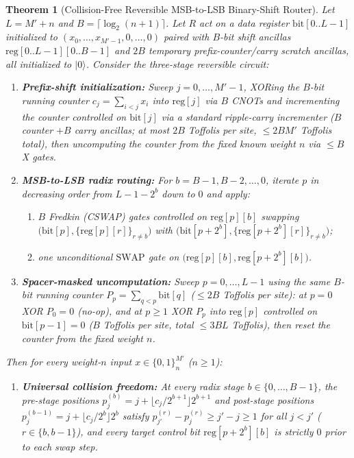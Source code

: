 \documentclass[11pt,a4paper]{article}
\newtheorem{theorem}{Theorem}
\theoremstyle{remark}
\newcommand{\ket}[1]{\lvert #1 \rangle}
\begin{document}
\begin{theorem}[Collision-Free Reversible MSB-to-LSB Binary-Shift Router]
\label{thm:C}
Let $L = M' + n$ and $B = \lceil \log_2(n + 1) \rceil$. Let $R$ act on a data register $\mathrm{bit}[0..L-1]$ initialized to $(x_0,\dots,x_{M'-1},0,\dots,0)$ paired with $B$-bit shift ancillas $\mathrm{reg}[0..L-1][0..B-1]$ and $2B$ temporary prefix-counter/carry scratch ancillas, all initialized to $\ket{0}$. Consider the three-stage reversible circuit:
\begin{enumerate}
\item \textbf{Prefix-shift initialization:} Sweep $j = 0, \dots, M' - 1$, XORing the $B$-bit running counter $c_j = \sum_{i < j} x_i$ into $\mathrm{reg}[j]$ via $B$ CNOTs and incrementing the counter controlled on $\mathrm{bit}[j]$ via a standard ripple-carry incrementer ($B$ counter $+ B$ carry ancillas; at most $2B$ Toffolis per site, $\le 2 B M'$ Toffolis total), then uncomputing the counter from the fixed known weight $n$ via $\le B$ X gates.
\item \textbf{MSB-to-LSB radix routing:} For $b = B - 1, B - 2, \dots, 0$, iterate $p$ in decreasing order from $L - 1 - 2^b$ down to $0$ and apply:
\begin{enumerate}
\item[(a)] $B$ Fredkin (CSWAP) gates controlled on $\mathrm{reg}[p][b]$ swapping $\bigl(\mathrm{bit}[p], \{\mathrm{reg}[p][r]\}_{r \neq b}\bigr)$ with $\bigl(\mathrm{bit}[p + 2^b], \{\mathrm{reg}[p + 2^b][r]\}_{r \neq b}\bigr)$;
\item[(b)] one unconditional $\mathrm{SWAP}$ gate on $\bigl(\mathrm{reg}[p][b], \mathrm{reg}[p + 2^b][b]\bigr)$.
\end{enumerate}
\item \textbf{Spacer-masked uncomputation:} Sweep $p = 0, \dots, L - 1$ using the same $B$-bit running counter $P_p = \sum_{q < p} \mathrm{bit}[q]$ ($\le 2B$ Toffolis per site): at $p = 0$ XOR $P_0 = 0$ (no-op), and at $p \ge 1$ XOR $P_p$ into $\mathrm{reg}[p]$ controlled on $\mathrm{bit}[p - 1] = 0$ ($B$ Toffolis per site, total $\le 3 B L$ Toffolis), then reset the counter from the fixed weight $n$.
\end{enumerate}
Then for every weight-$n$ input $x \in \{0,1\}^{M'}_n$ ($n \ge 1$):
\begin{enumerate}
\item[\textnormal{(i)}] \textbf{Universal collision freedom:} At every radix stage $b \in \{0,\dots,B-1\}$, the pre-stage positions $p_j^{(b)} = j + \lfloor c_j / 2^{b+1} \rfloor 2^{b+1}$ and post-stage positions $p_j^{(b-1)} = j + \lfloor c_j / 2^b \rfloor 2^b$ satisfy $p_{j'}^{(r)} - p_j^{(r)} \ge j' - j \ge 1$ for all $j < j'$ ($r \in \{b, b-1\}$), and every target control bit $\mathrm{reg}[p + 2^b][b]$ is strictly $0$ prior to each swap step.

\end{enumerate}
\end{theorem}
\end{document}
